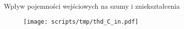 \begin{frame}{Wpływ pojemności wejściowych na szumy i zniekształcenia}
    \begin{figure}[H]
        \centering
        \texttt{[image: scripts/tmp/thd\_C\_in.pdf]} 
    \end{figure}

\end{frame}
